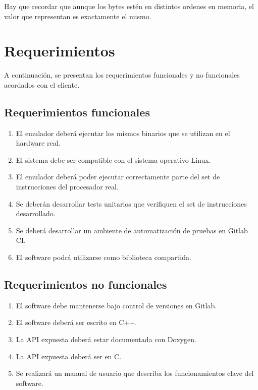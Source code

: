 Hay que recordar que aunque los bytes estén en distintos ordenes en memoria, el valor que representan es exactamente el mismo.


\section{Requerimientos}
\label{sec:requerimientos}

A continuación, se presentan los requerimientos funcionales y no funcionales acordados con el cliente.

\subsection{Requerimientos funcionales}
\label{subsec:requerimientos_funcionales}

\begin{enumerate}
\item El emulador deberá ejecutar los mismos binarios que se utilizan en el hardware real.
\item El sistema debe ser compatible con el sistema operativo Linux.
\item El emulador deberá poder ejecutar correctamente parte del set de instrucciones del procesador real.
\item Se deberán desarrollar tests unitarios que verifiquen el set de instrucciones desarrollado.
\item Se deberá desarrollar un ambiente de automatización de pruebas en Gitlab CI.
\item El software podrá utilizarse como biblioteca compartida.
\end{enumerate}

\subsection{Requerimientos no funcionales}
\label{subsec:requerimientos_no_funcionales}

\begin{enumerate}
\item El software debe mantenerse bajo control de versiones en Gitlab.
\item El software deberá ser escrito en C++.
\item La API expuesta deberá estar documentada con Doxygen.
\item La API expuesta deberá ser en C.
\item Se realizará un manual de usuario que describa los funcionamientos clave del software.
\end{enumerate}

